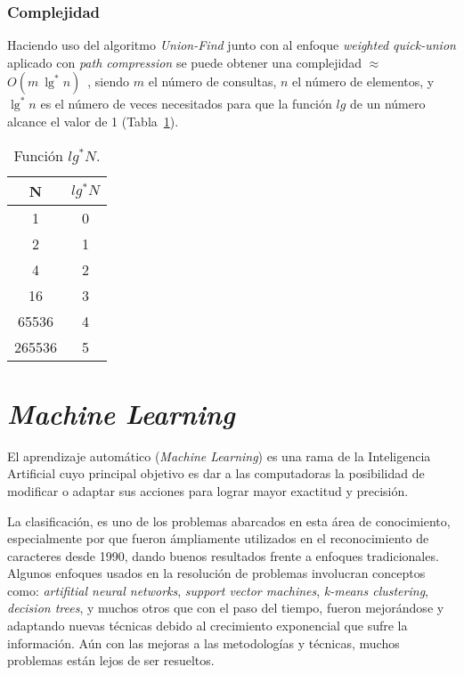 \subsubsection{Complejidad}

Haciendo uso del algoritmo \textit{Union-Find} junto con al enfoque 
\textit{weighted quick-union} aplicado con \textit{path compression} se puede
obtener una complejidad $\approx$ $O(m~ \lg^*n)$~\cite{Mirzaian:AofUF:web}, 
siendo $m$ el número de consultas, $n$ el número de elementos, y $\lg^*n$ es 
el número de veces necesitados para que la función $lg$ de un número alcance 
el valor de 1 (Tabla~\ref{Tab:Cap-marcoteorico:lg*n}).

\begin{table}[h!]
  \centering
  \begin{tabular}{|c|c|}
    \hline 
    N & $lg^*N$ \\ 
	  \hline
		1 & 0 \\	  
		2 & 1 \\
		4 & 2 \\		
		16 & 3 \\		
		65536 & 4 \\		
		265536 & 5 \\
	  \hline
  \end{tabular}
  \caption{Función $lg^*N$.}
  \label{Tab:Cap-marcoteorico:lg*n}
\end{table}

\nocite{UF:proof2}

\section{\textit{Machine Learning}}
\label{sec:machine-learning}
	El aprendizaje automático (\textit{Machine Learning}) es una rama de la 
	Inteligencia Artificial cuyo principal objetivo es dar a las computadoras la
	posibilidad de modificar o adaptar sus acciones para lograr mayor exactitud 
	y precisión.
	
	La clasificación, es uno de los problemas abarcados en esta área de 
	conocimiento, especialmente por que fueron ámpliamente utilizados en el 
	reconocimiento de caracteres desde 1990, dando buenos resultados frente a 
	enfoques tradicionales. Algunos enfoques usados en la resolución de
	problemas involucran conceptos como: \textit{artifitial neural networks},
	\textit{support vector machines}, \textit{k-means clustering},
	\textit{decision trees}, y muchos otros que con el paso del tiempo, fueron
	mejorándose y adaptando nuevas técnicas debido al crecimiento exponencial 
	que sufre la información. Aún con las mejoras a las metodologías y técnicas,
	muchos problemas están lejos de ser resueltos.

